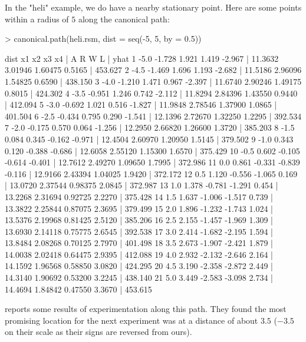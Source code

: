 \documentclass[article,nojss]{jss}
\begin{document}
In the "heli" example, we do have a nearby stationary point.  Here are some points within a radius of $5$ along the canonical path:
\begin{Schunk}
\begin{Sinput}
> canonical.path(heli.rsm, dist = seq(-5, 5, by = 0.5))
\end{Sinput}
\begin{Soutput}
   dist     x1     x2     x3     x4 |       A       R       W      L |    yhat
1  -5.0 -1.728  1.921  1.419 -2.967 | 11.3632 3.01946 1.60475 0.5165 | 453.627
2  -4.5 -1.469  1.696  1.193 -2.682 | 11.5186 2.96096 1.54825 0.6590 | 438.150
3  -4.0 -1.210  1.471  0.967 -2.397 | 11.6740 2.90246 1.49175 0.8015 | 424.302
4  -3.5 -0.951  1.246  0.742 -2.112 | 11.8294 2.84396 1.43550 0.9440 | 412.094
5  -3.0 -0.692  1.021  0.516 -1.827 | 11.9848 2.78546 1.37900 1.0865 | 401.504
6  -2.5 -0.434  0.795  0.290 -1.541 | 12.1396 2.72670 1.32250 1.2295 | 392.534
7  -2.0 -0.175  0.570  0.064 -1.256 | 12.2950 2.66820 1.26600 1.3720 | 385.203
8  -1.5  0.084  0.345 -0.162 -0.971 | 12.4504 2.60970 1.20950 1.5145 | 379.502
9  -1.0  0.343  0.120 -0.388 -0.686 | 12.6058 2.55120 1.15300 1.6570 | 375.429
10 -0.5  0.602 -0.105 -0.614 -0.401 | 12.7612 2.49270 1.09650 1.7995 | 372.986
11  0.0  0.861 -0.331 -0.839 -0.116 | 12.9166 2.43394 1.04025 1.9420 | 372.172
12  0.5  1.120 -0.556 -1.065  0.169 | 13.0720 2.37544 0.98375 2.0845 | 372.987
13  1.0  1.378 -0.781 -1.291  0.454 | 13.2268 2.31694 0.92725 2.2270 | 375.428
14  1.5  1.637 -1.006 -1.517  0.739 | 13.3822 2.25844 0.87075 2.3695 | 379.499
15  2.0  1.896 -1.232 -1.743  1.024 | 13.5376 2.19968 0.81425 2.5120 | 385.206
16  2.5  2.155 -1.457 -1.969  1.309 | 13.6930 2.14118 0.75775 2.6545 | 392.538
17  3.0  2.414 -1.682 -2.195  1.594 | 13.8484 2.08268 0.70125 2.7970 | 401.498
18  3.5  2.673 -1.907 -2.421  1.879 | 14.0038 2.02418 0.64475 2.9395 | 412.088
19  4.0  2.932 -2.132 -2.646  2.164 | 14.1592 1.96568 0.58850 3.0820 | 424.295
20  4.5  3.190 -2.358 -2.872  2.449 | 14.3140 1.90692 0.53200 3.2245 | 438.140
21  5.0  3.449 -2.583 -3.098  2.734 | 14.4694 1.84842 0.47550 3.3670 | 453.615
\end{Soutput}
\end{Schunk}
\citet[Table~12.7 and~Figure~12.6]{Box05} reports some results of experimentation along this path.  They found the most promising location for the next experiment was at a distance of about $3.5$ ($-3.5$ on their scale as their signs are reversed from ours).
\end{document}
